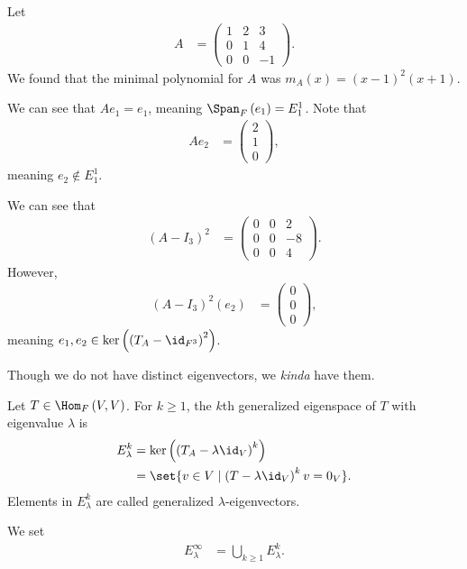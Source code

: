\documentclass[10pt]{mypackage}
\begin{document}
\begin{example}
  Let
  \begin{align*}
    A &= \begin{pmatrix}1 & 2 & 3 \\ 0 & 1 & 4 \\ 0 & 0 & -1\end{pmatrix}.
  \end{align*}
  We found that the minimal polynomial for $A$ was $m_A(x) = \left(x-1\right)^2 \left(x+1\right)$.\newline

  We can see that $Ae_{1} = e_1$, meaning $\Span_{F}\left(e_1\right) = E_{1}^{1}$. Note that
  \begin{align*}
    Ae_2 &= \begin{pmatrix}2\\1\\0\end{pmatrix},
  \end{align*}
  meaning $e_2 \notin E_{1}^{1}$.\newline

  We can see that
  \begin{align*}
    \left(A-I_{3}\right)^{2} &= \begin{pmatrix}0 & 0 & 2 \\ 0 & 0 & -8 \\ 0 & 0 & 4\end{pmatrix}.
  \end{align*}
  However,
  \begin{align*}
    \left(A-I_{3}\right)^2\left(e_2\right) &= \begin{pmatrix}0\\0\\0\end{pmatrix},
  \end{align*}
  meaning $e_1,e_2\in \ker\left(\left(T_A - \id_{F^3}\right)^2\right)$.\newline

  Though we do not have distinct eigenvectors, we \textit{kinda} have them.
\end{example}
\begin{definition}
  Let $T\in \Hom_{F}\left(V,V\right)$. For $k\geq 1$, the $k$th generalized eigenspace of $T$ with eigenvalue $\lambda$ is
  \begin{align*}
    E_{\lambda}^{k} &= \ker\left(\left(T_A - \lambda\id_{V}\right)^{k}\right)\\
                    &= \set{v\in V \mid \left(T-\lambda \id_{V}\right)^{k}v = 0_V}.
  \end{align*}
  Elements in $E_{\lambda}^{k}$ are called generalized $\lambda$-eigenvectors.\newline

  We set
  \begin{align*}
    E_{\lambda}^{\infty} &= \bigcup_{k\geq 1}E_{\lambda}^{k}.
  \end{align*}
\end{definition}
\end{document}
